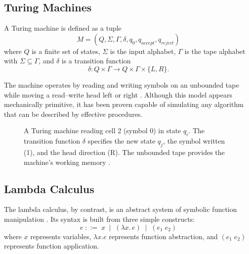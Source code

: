 \documentclass[12pt]{article}
\theoremstyle{definition}
\begin{document}
\subsection{Turing Machines}

A Turing machine is defined as a tuple
\[
M = (Q, \Sigma, \Gamma, \delta, q_0, q_{accept}, q_{reject})
\]
where $Q$ is a finite set of states, $\Sigma$ is the input alphabet,
$\Gamma$ is the tape alphabet with $\Sigma \subseteq \Gamma$, and
$\delta$ is a transition function
\[
\delta : Q \times \Gamma \rightarrow Q \times \Gamma \times \{L,R\}.
\]

The machine operates by reading and writing symbols on an unbounded tape
while moving a read--write head left or right \cite{turing1936}. Although
this model appears mechanically primitive, it has been proven capable of
simulating any algorithm that can be described by effective procedures.

\begin{figure}[h]
\centering
{}
\caption{A Turing machine reading cell 2 (symbol 0) in state $q_i$.
The transition function $\delta$ specifies the new state $q_j$, the
symbol written (1), and the head direction (R). The unbounded tape
provides the machine's working memory \cite{turing1936}.}
\label{fig:turing}
\end{figure}

\subsection{Lambda Calculus}

The lambda calculus, by contrast, is an abstract system of symbolic
function manipulation \cite{church1936}. Its syntax is built from three
simple constructs:
\[
e \;::=\; x \;\mid\; (\lambda x.\, e) \;\mid\; (e_1 \; e_2)
\]
where $x$ represents variables, $\lambda x.e$ represents function
abstraction, and $(e_1 \; e_2)$ represents function application.
\end{document}
